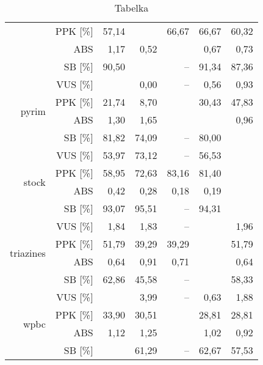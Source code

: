 \documentclass[10pt,a4paper]{article}
\begin{document}
\begin{table}[ht]
\begin{tabular}{rrrrrrr}
   & PPK [\%] & 57,14 & \color{red}{68,25} & 66,67 & 66,67 & 60,32 \\ 
   & ABS & 1,17 & 0,52 & \color{red}{0,51} & 0,67 & 0,73 \\ 
   & SB [\%] & 90,50 & \color{red}{92,87} & -- & 91,34 & 87,36 \\ 
   \hline
\multirow{4}{15mm}{pyrim} & VUS [\%] & \color{red}{1,11} & 0,00 & -- & 0,56 & 0,93 \\ 
   & PPK [\%] & 21,74 & 8,70 & \color{red}{52,17} & 30,43 & 47,83 \\ 
   & ABS & 1,30 & 1,65 & \color{red}{0,91} & \color{red}{0,91} & 0,96 \\ 
   & SB [\%] & 81,82 & 74,09 & -- & 80,00 & \color{red}{82,73} \\ 
   \hline
\multirow{4}{15mm}{stock} & VUS [\%] & 53,97 & 73,12 & -- & 56,53 & \color{red}{96,01} \\ 
   & PPK [\%] & 58,95 & 72,63 & 83,16 & 81,40 & \color{red}{91,58} \\ 
   & ABS & 0,42 & 0,28 & 0,18 & 0,19 & \color{red}{0,08} \\ 
   & SB [\%] & 93,07 & 95,51 & -- & 94,31 & \color{red}{99,42} \\ 
   \hline
\multirow{4}{15mm}{triazines} & VUS [\%] & 1,84 & 1,83 & -- & \color{red}{5,45} & 1,96 \\ 
   & PPK [\%] & 51,79 & 39,29 & 39,29 & \color{red}{53,57} & 51,79 \\ 
   & ABS & 0,64 & 0,91 & 0,71 & \color{red}{0,61} & 0,64 \\ 
   & SB [\%] & 62,86 & 45,58 & -- & \color{red}{66,46} & 58,33 \\ 
   \hline
\multirow{4}{15mm}{wpbc} & VUS [\%] & \color{red}{4,44} & 3,99 & -- & 0,63 & 1,88 \\ 
   & PPK [\%] & 33,90 & 30,51 & \color{red}{35,59} & 28,81 & 28,81 \\ 
   & ABS & 1,12 & 1,25 & \color{red}{0,86} & 1,02 & 0,92 \\ 
   & SB [\%] & \color{red}{67,59} & 61,29 & -- & 62,67 & 57,53 \\ 
   \hline
\end{tabular}
\caption{Tabelka} 
\end{table}
\end{document}
